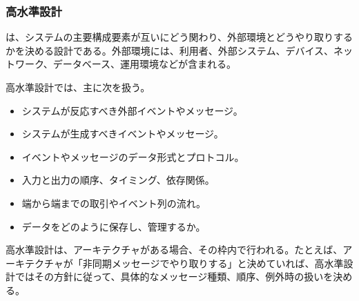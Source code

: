\subsubsection{高水準設計}

 は、システムの主要構成要素が互いにどう関わり、外部環境とどうやり取りするかを決める設計である。外部環境には、利用者、外部システム、デバイス、ネットワーク、データベース、運用環境などが含まれる。

高水準設計では、主に次を扱う。
\begin{itemize}
  \item システムが反応すべき外部イベントやメッセージ。
  \item システムが生成すべきイベントやメッセージ。
  \item イベントやメッセージのデータ形式とプロトコル。
  \item 入力と出力の順序、タイミング、依存関係。
  \item 端から端までの取引やイベント列の流れ。
  \item データをどのように保存し、管理するか。
\end{itemize}

高水準設計は、アーキテクチャがある場合、その枠内で行われる。たとえば、アーキテクチャが「非同期メッセージでやり取りする」と決めていれば、高水準設計ではその方針に従って、具体的なメッセージ種類、順序、例外時の扱いを決める。
